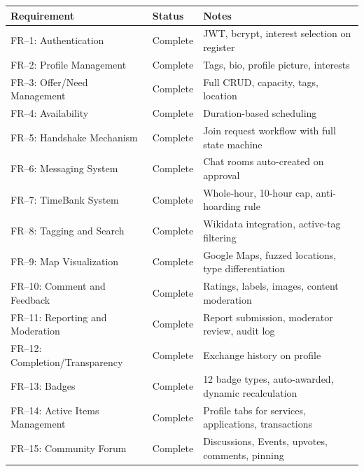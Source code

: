 \documentclass[11pt,a4paper]{report}
\begin{document}
\begin{longtable}{|p{5.5cm}|p{2cm}|p{6cm}|}
    \hline
    \textbf{Requirement}              & \textbf{Status} & \textbf{Notes}                                        \\
    \hline
    \endhead
    FR--1: Authentication             & Complete        & JWT, bcrypt, interest selection on register           \\
    \hline
    FR--2: Profile Management         & Complete        & Tags, bio, profile picture, interests                 \\
    \hline
    FR--3: Offer/Need Management      & Complete        & Full CRUD, capacity, tags, location                   \\
    \hline
    FR--4: Availability               & Complete        & Duration-based scheduling                             \\
    \hline
    FR--5: Handshake Mechanism        & Complete        & Join request workflow with full state machine         \\
    \hline
    FR--6: Messaging System           & Complete        & Chat rooms auto-created on approval                   \\
    \hline
    FR--7: TimeBank System            & Complete        & Whole-hour, 10-hour cap, anti-hoarding rule           \\
    \hline
    FR--8: Tagging and Search         & Complete        & Wikidata integration, active-tag filtering            \\
    \hline
    FR--9: Map Visualization          & Complete        & Google Maps, fuzzed locations, type differentiation   \\
    \hline
    FR--10: Comment and Feedback      & Complete        & Ratings, labels, images, content moderation           \\
    \hline
    FR--11: Reporting and Moderation  & Complete        & Report submission, moderator review, audit log        \\
    \hline
    FR--12: Completion/Transparency   & Complete        & Exchange history on profile                           \\
    \hline
    FR--13: Badges                    & Complete        & 12 badge types, auto-awarded, dynamic recalculation   \\
    \hline
    FR--14: Active Items Management   & Complete        & Profile tabs for services, applications, transactions \\
    \hline
    FR--15: Community Forum           & Complete        & Discussions, Events, upvotes, comments, pinning       \\

\end{longtable}
\end{document}
